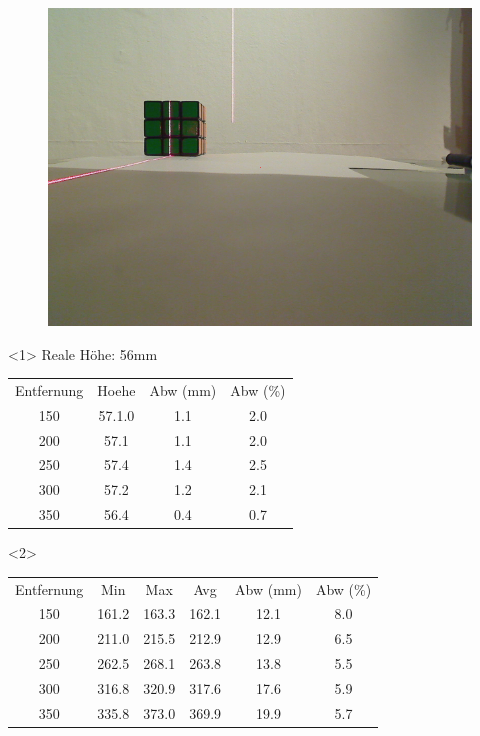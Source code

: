 \documentclass{beamer}
\begin{document}
\begin{frame}
\begin{figure}
\begin{minipage}{0.32\linewidth}
		\end{minipage}
		\hfill
		\begin{minipage}{0.32\linewidth}
			\includegraphics[width=\linewidth]{includes/test_dist_3}
		\end{minipage}
	\end{figure}

	\begin{onlyenv}
		Reale Höhe: 56mm
		\begin{tabular}{c|c|c|c}
			Entfernung & Hoehe & Abw (mm) & Abw (\%) \\
			150 & 57.1.0 & 1.1 & 2.0\\
			200 & 57.1 & 1.1 & 2.0\\
			250 & 57.4 & 1.4 & 2.5\\
			300 & 57.2 & 1.2 & 2.1\\
			350 & 56.4 & 0.4 & 0.7
		\end{tabular}
	\end{onlyenv}
	\begin{onlyenv}
		\begin{tabular}{c|c|c|c|c|c}
			Entfernung & Min & Max & Avg & Abw (mm) & Abw (\%)\\
			150 & 161.2 & 163.3 & 162.1 & 12.1 & 8.0\\
			200 & 211.0 & 215.5 & 212.9 & 12.9 & 6.5\\
			250 & 262.5 & 268.1 & 263.8 & 13.8 & 5.5\\
			300 & 316.8 & 320.9 & 317.6 & 17.6 & 5.9\\
			350 & 335.8 & 373.0 & 369.9 & 19.9 & 5.7
		\end{tabular}
	\end{onlyenv}

\end{frame}
\end{document}
